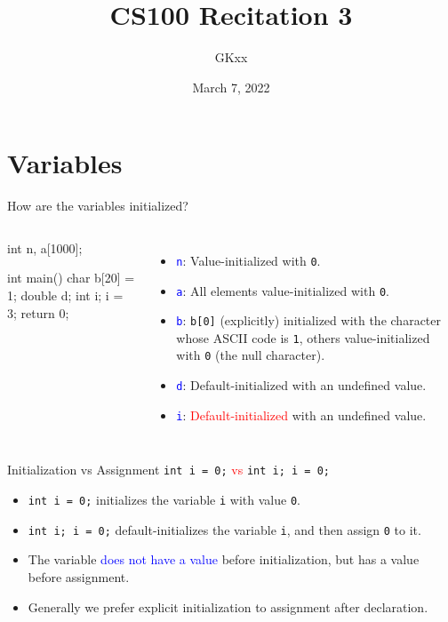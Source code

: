 \documentclass{beamer}
\title{CS100 Recitation 3}
\author{GKxx}
\date{March 7, 2022}
\newcommand{\red}[1]{\textcolor{red}{#1}}
\newcommand{\blue}[1]{\textcolor{blue}{#1}}
\newcommand{\ttt}[1]{\texttt{#1}}
\newcommand{\bluett}[1]{\blue{\ttt{#1}}}
\begin{document}
\begin{frame}
    \titlepage
\end{frame}


\section{Variables}

\begin{frame}[fragile]{How are the variables initialized?}
    \begin{columns}
        \begin{cpp}
int n, a[1000];

int main() {
  char b[20] = {1};
  double d;
  int i;
  i = 3;
  return 0;
}
        \end{cpp}
        \pause
        \begin{itemize}
            \item \bluett{n}: Value-initialized with \ttt{0}.
            \item \bluett{a}: All elements value-initialized with \ttt{0}.
            \item \bluett{b}: \ttt{b[0]} (explicitly) initialized with the character whose ASCII code is \ttt{1}, others value-initialized with \ttt{0} (the null character).
            \item \bluett{d}: Default-initialized with an undefined value.
            \item \bluett{i}: \red{Default-initialized} with an undefined value.
        \end{itemize}
    \end{columns}
\end{frame}

\begin{frame}{Initialization vs Assignment}
    \ttt{int i = 0;} \red{vs} \ttt{int i; i = 0;}
    \pause
    \begin{itemize}
        \item \ttt{int i = 0;} initializes the variable \ttt{i} with value \ttt{0}.
        \item \ttt{int i; i = 0;} default-initializes the variable \ttt{i}, and then assign \ttt{0} to it.
        \pause
        \item The variable \blue{does not have a value} before initialization, but has a value before assignment.
        \item Generally we prefer explicit initialization to assignment after declaration.
    \end{itemize}
\end{frame}
\end{document}
